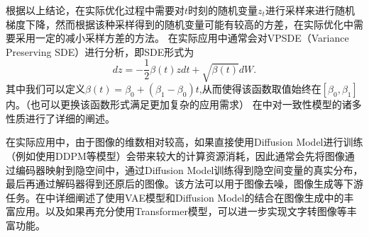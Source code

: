 根据以上结论，在实际优化过程中需要对$t$时刻的随机变量$z_t$进行采样来进行随机梯度下降，然而根据该种采样得到的随机变量可能有较高的方差，在实际优化中需要采用一定的减小采样方差的方法。 在实际应用中通常会对VPSDE（Variance Preserving SDE）进行分析，即SDE形式为
\begin{equation}
    dz = -\frac{1}{2}\beta(t)zdt + \sqrt{\beta(t)}dW.
    \label{VPSDE}
\end{equation}
其中我们可以定义$\beta(t) = \beta_0+(\beta_1-\beta_0)t$,从而使得该函数取值始终在$[\beta_0,\beta_1]$内。（也可以更换该函数形式满足更加复杂的应用需求）
在\cite{Consistency}中对一致性模型的诸多性质进行了详细的阐述。\par 
在实际应用中，由于图像的维数相对较高，如果直接使用Diffusion Model进行训练（例如使用DDPM等模型）会带来较大的计算资源消耗，因此通常会先将图像通过编码器映射到隐空间中，通过Diffusion Model训练得到隐空间变量的真实分布，最后再通过解码器得到还原后的图像。该方法可以用于图像去噪，图像生成等下游任务。在\cite{High_synthesis}中详细阐述了使用VAE模型和Diffusion Model的结合在图像生成中的丰富应用。以及如果再充分使用Transformer模型，可以进一步实现文字转图像等丰富功能。